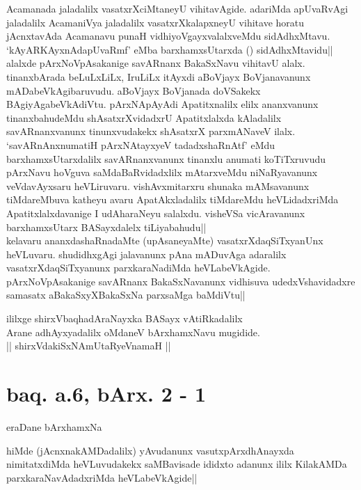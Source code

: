 \begin{artha}
{Acamanada jaladalilx vasatxrXciMtaneyU vihitavAgide. adariMda 
apUvaRvAgi jaladalilx AcamaniVya jaladalilx vasatxrXkalapxneyU 
vihitave horatu jAcnxtavAda Acamanavu punaH vidhiyoVgayxvalalxveMdu 
sidAdhxMtavu.\\
`kAyARKAyxnAdapUvaRmf' eMba barxhamxsUtarxda () sidAdhxMtavidu|| 
alalxde pArxNoVpAsakanige savARnanx BakaSxNavu vihitavU alalx. 
tinanxbArada beLuLxLiLx, IruLiLx itAyxdi aBoVjayx BoVjanavanunx 
mADabeVkAgibaruvudu. aBoVjayx BoVjanada doVSakekx BAgiyAgabeVkAdiVtu. 
pArxNApAyAdi Apatitxnalilx elilx ananxvanunx tinanxbahudeMdu 
shAsatxrXvidadxrU Apatitxlalxda kAladalilx savARnanxvanunx 
tinunxvudakekx shAsatxrX parxmANaveV ilalx. `savARnAnxnumatiH 
pArxNAtayxyeV tadadxshaRnAtf' eMdu barxhamxsUtarxdalilx 
savARnanxvanunx tinanxlu anumati koTiTxruvudu pArxNavu hoVguva 
saMdaBaRvidadxlilx mAtarxveMdu niNaRyavanunx veVdavAyxsaru 
heVLiruvaru. vishAvxmitarxru shunaka mAMsavanunx tiMdareMbuva katheyu 
avaru ApatAkxladalilx tiMdareMdu heVLidadxriMda Apatitxlalxdavanige I 
udAharaNeyu salalxdu. visheVSa vicAravanunx barxhamxsUtarx 
BASayxdalelx tiLiyabahudu||}\\
kelavaru ananxdashaRnadaMte (upAsaneyaMte) vasatxrXdaqSiTxyanUnx 
heVLuvaru. shudidhxgAgi jalavanunx pAna mADuvAga adaralilx 
vasatxrXdaqSiTxyanunx parxkaraNadiMda heVLabeVkAgide. 
pArxNoVpAsakanige savARnanx BakaSxNavanunx vidhisuva udedxVshavidadxre 
samasatx aBakaSxyXBakaSxNa parxsaMga baMdiVtu||
\end{artha}

\begin{center}
ililxge shirxVbaqhadAraNayxka BASayx vAtiRkadalilx\\
Arane adhAyxyadalilx oMdaneV bArxhamxNavu mugidide.\\
|| shirxVdakiSxNAmUtaRyeVnamaH ||
\end{center}


\section*{baq. a.6, bArx. 2 - 1}

\begin{center}
eraDane bArxhamxNa
\end{center}

\begin{artha}
hiMde (jAcnxnakAMDadalilx) yAvudanunx vasutxpArxdhAnayxda 
nimitatxdiMda heVLuvudakekx saMBavisade ididxto adanunx ililx 
KilakAMDa parxkaraNavAdadxriMda heVLabeVkAgide||
\end{artha}

